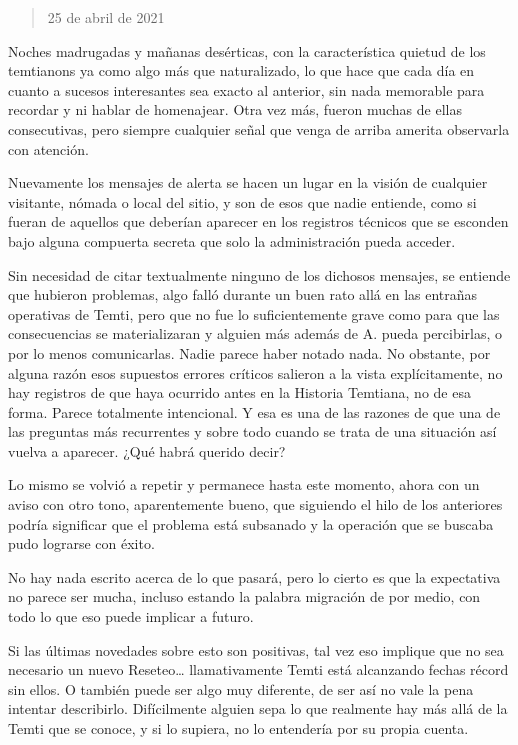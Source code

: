 \documentclass[
]{book}
\begin{document}
\begin{quote}
25 de abril de 2021
\end{quote}

Noches madrugadas y mañanas desérticas, con la característica quietud de los temtianons ya como algo más que naturalizado, lo que hace que cada día en cuanto a sucesos interesantes sea exacto al anterior, sin nada memorable para recordar y ni hablar de homenajear. Otra vez más, fueron muchas de ellas consecutivas, pero siempre cualquier señal que venga de arriba amerita observarla con atención.

Nuevamente los mensajes de alerta se hacen un lugar en la visión de cualquier visitante, nómada o local del sitio, y son de esos que nadie entiende, como si fueran de aquellos que deberían aparecer en los registros técnicos que se esconden bajo alguna compuerta secreta que solo la administración pueda acceder.

Sin necesidad de citar textualmente ninguno de los dichosos mensajes, se entiende que hubieron problemas, algo falló durante un buen rato allá en las entrañas operativas de Temti, pero que no fue lo suficientemente grave como para que las consecuencias se materializaran y alguien más además de A. pueda percibirlas, o por lo menos comunicarlas. Nadie parece haber notado nada. No obstante, por alguna razón esos supuestos errores críticos salieron a la vista explícitamente, no hay registros de que haya ocurrido antes en la Historia Temtiana, no de esa forma. Parece totalmente intencional. Y esa es una de las razones de que una de las preguntas más recurrentes y sobre todo cuando se trata de una situación así vuelva a aparecer. ¿Qué habrá querido decir?

Lo mismo se volvió a repetir y permanece hasta este momento, ahora con un aviso con otro tono, aparentemente bueno, que siguiendo el hilo de los anteriores podría significar que el problema está subsanado y la operación que se buscaba pudo lograrse con éxito.

No hay nada escrito acerca de lo que pasará, pero lo cierto es que la expectativa no parece ser mucha, incluso estando la palabra migración de por medio, con todo lo que eso puede implicar a futuro.

Si las últimas novedades sobre esto son positivas, tal vez eso implique que no sea necesario un nuevo Reseteo\ldots{} llamativamente Temti está alcanzando fechas récord sin ellos. O también puede ser algo muy diferente, de ser así no vale la pena intentar describirlo. Difícilmente alguien sepa lo que realmente hay más allá de la Temti que se conoce, y si lo supiera, no lo entendería por su propia cuenta.
\end{document}
